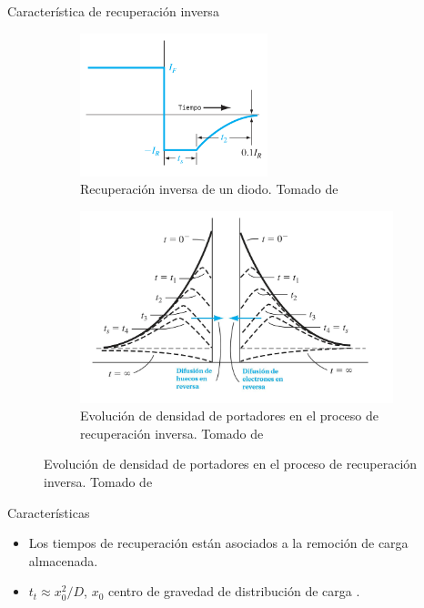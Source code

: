 \documentclass{beamer}
\begin{document}
\begin{frame}{Característica de recuperación inversa}

    \begin{figure}[t]
        \centering
        \begin{subfigure}[b]{0.45\textwidth}
            \centering
            \includegraphics[width=0.6\textwidth]{images/diode_reverse_recovery.png}
            \caption{Recuperación inversa de un diodo. Tomado de
            \cite{neamen2012semiconductor}}
            \label{fig:diode_reverse_recovery}
        \end{subfigure}
        \hfill
        \begin{subfigure}[b]{0.45\textwidth}
            \centering
            \includegraphics[width=\textwidth]{images/carrier_concentrations_turnoff.jpg}
            \caption{Evolución de densidad de portadores en el proceso de
            recuperación inversa. Tomado de \cite{neamen2012semiconductor}}
            \label{fig:carrier_concentrations_turnoff}
        \end{subfigure}
    \end{figure}

    \begin{block}{Características}
        \begin{itemize}
            \item Los tiempos de recuperación están asociados a la remoción de
                carga almacenada.
            \item $t_t \approx x_0^2/D$, $x_0$ centro de gravedad de
                distribución de carga \cite{moll1962}.
        \end{itemize}
    \end{block}
\end{frame}
\end{document}
